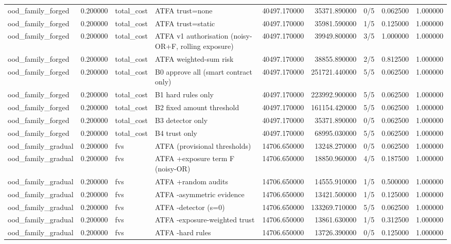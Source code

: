 \begin{tabular}{lrllrrlrr}
ood\_family\_forged & 0.200000 & total\_cost & ATFA trust=none & 40497.170000 & 35371.890000 & 0/5 & 0.062500 & 1.000000 \\
ood\_family\_forged & 0.200000 & total\_cost & ATFA trust=static & 40497.170000 & 35981.590000 & 1/5 & 0.125000 & 1.000000 \\
ood\_family\_forged & 0.200000 & total\_cost & ATFA v1 authorisation (noisy-OR+F, rolling exposure) & 40497.170000 & 39949.800000 & 3/5 & 1.000000 & 1.000000 \\
ood\_family\_forged & 0.200000 & total\_cost & ATFA weighted-sum risk & 40497.170000 & 38855.890000 & 2/5 & 0.812500 & 1.000000 \\
ood\_family\_forged & 0.200000 & total\_cost & B0 approve all (smart contract only) & 40497.170000 & 251721.440000 & 5/5 & 0.062500 & 1.000000 \\
ood\_family\_forged & 0.200000 & total\_cost & B1 hard rules only & 40497.170000 & 223992.900000 & 5/5 & 0.062500 & 1.000000 \\
ood\_family\_forged & 0.200000 & total\_cost & B2 fixed amount threshold & 40497.170000 & 161154.420000 & 5/5 & 0.062500 & 1.000000 \\
ood\_family\_forged & 0.200000 & total\_cost & B3 detector only & 40497.170000 & 35371.890000 & 0/5 & 0.062500 & 1.000000 \\
ood\_family\_forged & 0.200000 & total\_cost & B4 trust only & 40497.170000 & 68995.030000 & 5/5 & 0.062500 & 1.000000 \\
ood\_family\_gradual & 0.200000 & fvs & ATFA (provisional thresholds) & 14706.650000 & 13248.270000 & 0/5 & 0.062500 & 1.000000 \\
ood\_family\_gradual & 0.200000 & fvs & ATFA +exposure term F (noisy-OR) & 14706.650000 & 18850.960000 & 4/5 & 0.187500 & 1.000000 \\
ood\_family\_gradual & 0.200000 & fvs & ATFA +random audits & 14706.650000 & 14555.910000 & 1/5 & 0.500000 & 1.000000 \\
ood\_family\_gradual & 0.200000 & fvs & ATFA -asymmetric evidence & 14706.650000 & 13421.500000 & 1/5 & 0.125000 & 1.000000 \\
ood\_family\_gradual & 0.200000 & fvs & ATFA -detector (s=0) & 14706.650000 & 133269.710000 & 5/5 & 0.062500 & 1.000000 \\
ood\_family\_gradual & 0.200000 & fvs & ATFA -exposure-weighted trust & 14706.650000 & 13861.630000 & 1/5 & 0.312500 & 1.000000 \\
ood\_family\_gradual & 0.200000 & fvs & ATFA -hard rules & 14706.650000 & 13726.390000 & 0/5 & 0.125000 & 1.000000 \\

\end{tabular}
